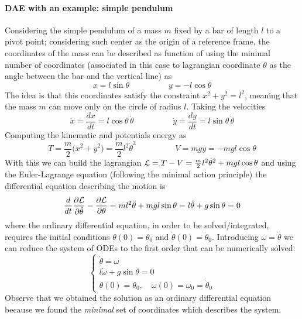 	\paragraph{DAE with an example: simple pendulum} Considering the simple pendulum of a mass $m$ fixed by a bar of length $l$ to a pivot point; considering such center as the origin of a reference frame, the coordinates of the mass can be described as function of using the minimal number of coordinates (associated in this case to lagrangian coordinate $\theta$ as the angle between the bar and the vertical line) as
	\[ x= l\sin\theta \hspace{2cm} y = -l\cos\theta \]
	The idea is that this coordinates satisfy the constraint $x^2 + y^2 = l^2$, meaning that the mass $m$ can move only on the circle of radius $l$. Taking the velocities
	\[ \dot x = \frac {dx}{dt} = l\cos\theta \, \dot\theta \hspace{2cm} \dot y = \frac{dy}{dt} = l\sin\theta \,\dot\theta \]
	Computing the kinematic and potentials energy as
	\[ T = \frac m 2 \big(\dot x^2 + \dot y^2\big) = \frac m2 l^2 \dot \theta^2 \hspace{2cm} V = mgy = -mgl\cos\theta  \]
	With this we can build the lagrangian $\mathcal L = T - V = \frac m 2 l^2 \dot \theta^2 + mg l\cos\theta$ and using the Euler-Lagrange equation (following the minimal action principle) the differential equation describing the motion is
	\[ \frac d{dt} \frac{\partial \mathcal L}{\partial \dot\theta} - \frac{\partial \mathcal L}{\partial \theta} = ml^2\ddot \theta + mgl\sin\theta = l\ddot \theta + g\sin\theta = 0 \]
	where the ordinary differential equation, in order to be solved/integrated, requires the initial conditions $\theta(0) = \theta_0$ and $\dot \theta(0) =\dot \theta_0$. Introducing $\omega = \dot \theta$ we can reduce the system of ODEs to the first order that can be numerically solved:
	\[ \begin{cases}
		\dot \theta = \omega \\
		l\dot \omega + g\sin\theta = 0 \\
		\theta(0)  = \theta_0 ,\quad \omega(0) = \omega_0 = \dot\theta_0
	\end{cases} \]
	Observe that we obtained the solution as an ordinary differential equation because we found the \textit{minimal} set of coordinates which describes the system.
	
